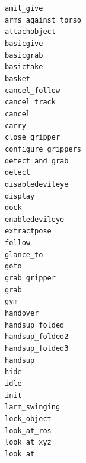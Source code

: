 \documentclass[compress]{beamer}
\begin{document}
{
\begin{frame}{}
    \begin{multicols}{4}
\scriptsize

{\tt amit\_give} \\
{\tt arms\_against\_torso} \\
{\tt attachobject} \\
{\tt basicgive} \\
{\tt basicgrab} \\
{\tt basictake} \\
{\tt basket} \\
{\tt cancel\_follow} \\
{\tt cancel\_track} \\
{\tt cancel} \\
{\tt carry} \\
{\tt close\_gripper} \\
{\tt configure\_grippers} \\
{\tt detect\_and\_grab} \\
{\tt detect} \\
{\tt disabledevileye} \\
{\tt display} \\
{\tt dock} \\
{\tt enabledevileye} \\
{\tt extractpose} \\
{\tt follow} \\
{\tt glance\_to} \\
{\tt goto} \\
{\tt grab\_gripper} \\
{\tt grab} \\
{\tt gym} \\
{\tt handover} \\
{\tt handsup\_folded} \\
{\tt handsup\_folded2} \\
{\tt handsup\_folded3} \\
{\tt handsup} \\
{\tt hide} \\
{\tt idle} \\
{\tt init} \\
{\tt larm\_swinging} \\
{\tt lock\_object} \\
{\tt look\_at\_ros} \\
{\tt look\_at\_xyz} \\
{\tt look\_at} \\

\end{multicols}
\end{frame}}
\end{document}
